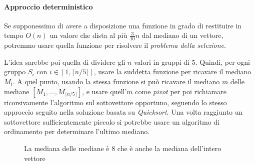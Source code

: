 
\paragraph{Approccio deterministico}
Se supponessimo di avere a disposizione una funzione in grado di restituire in
tempo $O(n)$ un valore che dista al più $\frac{3}{10}n$ dal mediano di un vettore,
potremmo usare quella funzione per risolvere il \emph{problema della selezione}.

L'idea sarebbe poi quella di dividere gli $n$ valori in gruppi di $5$. Quindi,
per ogni gruppo $S_i$ con $i\in[1,\lceil n/5\rceil]$, usare la suddetta funzione
per ricavare il mediano $M_i$. A quel punto, usando la stessa funzione si può
ricavare il mediano $m$ delle mediane $[M_1,\dots,M_{\rceil n/5\rceil}]$, e usare
quell'$m$ come \emph{pivot} per poi richiamare ricorsivamente l'algoritmo
sul sottovettore opportuno, seguendo lo stesso approccio seguito nella soluzione
basata su \emph{Quicksort}. Una volta raggiunto un sottovettore sufficientemente
piccolo si potrebbe usare un algoritmo di ordinamento per determinare l'ultimo
mediano.

\begin{figure}[h!]
\centering
{}
\caption{La mediana delle mediane è $8$ che è anche la mediana dell'intero vettore}
\end{figure}

